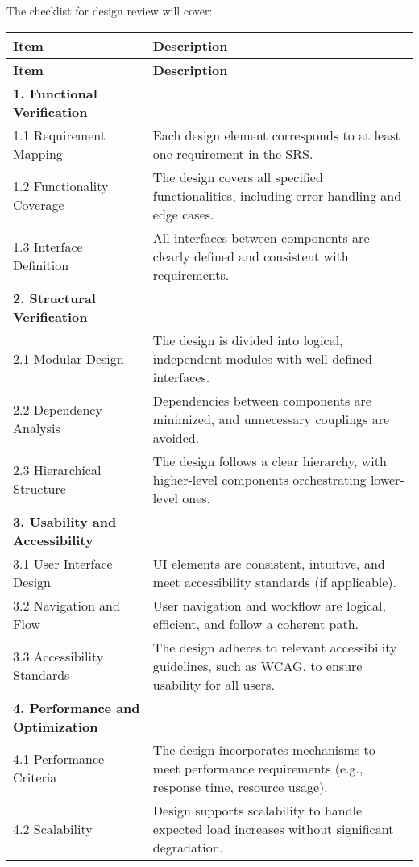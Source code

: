 \documentclass[12pt, titlepage]{article}
\begin{document}
The checklist for design review will cover:
\begin{center}
  \begin{longtable}{|p{4cm}|p{11cm}|}
  \hline
  \textbf{Item} & \textbf{Description} \\
  \hline
  \endfirsthead
  \hline
  \textbf{Item} & \textbf{Description} \\
  \hline
  \endhead
  
  \textbf{1. Functional Verification} & \\
  \hline
  1.1 Requirement Mapping & Each design element corresponds to at least one requirement in the SRS. \\
  \hline
  1.2 Functionality Coverage & The design covers all specified functionalities, including error handling and edge cases. \\
  \hline
  1.3 Interface Definition & All interfaces between components are clearly defined and consistent with requirements. \\
  \hline
  
  \textbf{2. Structural Verification} & \\
  \hline
  2.1 Modular Design & The design is divided into logical, independent modules with well-defined interfaces. \\
  \hline
  2.2 Dependency Analysis & Dependencies between components are minimized, and unnecessary couplings are avoided. \\
  \hline
  2.3 Hierarchical Structure & The design follows a clear hierarchy, with higher-level components orchestrating lower-level ones. \\
  \hline
  
  \textbf{3. Usability and Accessibility} & \\
  \hline
  3.1 User Interface Design & UI elements are consistent, intuitive, and meet accessibility standards (if applicable). \\
  \hline
  3.2 Navigation and Flow & User navigation and workflow are logical, efficient, and follow a coherent path. \\
  \hline
  3.3 Accessibility Standards & The design adheres to relevant accessibility guidelines, such as WCAG, to ensure usability for all users. \\
  \hline
  
  \textbf{4. Performance and Optimization} & \\
  \hline
  4.1 Performance Criteria & The design incorporates mechanisms to meet performance requirements (e.g., response time, resource usage). \\
  \hline
  4.2 Scalability & Design supports scalability to handle expected load increases without significant degradation. \\
  \hline
  

\end{longtable}
\end{center}
\end{document}
